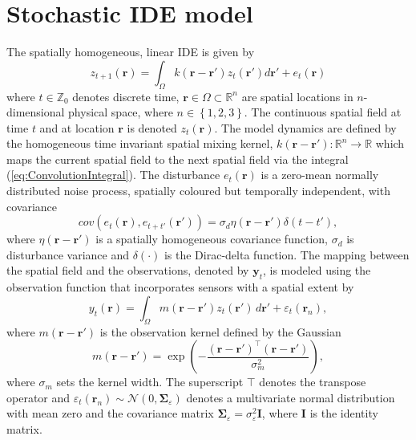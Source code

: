 \documentclass[draftcls,onecolumn]{IEEEtran}
\begin{document}
\section{Stochastic IDE model}
The spatially homogeneous, linear IDE is given by
\begin{equation}
 z_{t+1}\left(\mathbf{r}\right)=\int_{\Omega}k\left(\mathbf{r}-\mathbf{r}'\right)z_{t}\left(\mathbf{r}'\right)d\mathbf{r}'+e_{t}\left(\mathbf{r}\right)
\label{eq:ConvolutionIntegral}
\end{equation}
where $t\in \mathbb{Z}_0 $ denotes discrete time, $\mathbf{r} \in \Omega \subset \mathbb{R}^{n}$ are spatial locations in $n$-dimensional physical space, where $n \in \left\lbrace 1,2,3 \right\rbrace $. The continuous spatial field at time $t$ and at location $\mathbf r$ is denoted $z_t\left(\mathbf r\right)$. The model dynamics  are defined by the homogeneous time invariant spatial mixing kernel, $k\left(\mathbf{r}-\mathbf{r}'\right):\mathbb{R}^{n}\rightarrow \mathbb{R}$ which maps the current spatial field to the next spatial field via the integral (\ref{eq:ConvolutionIntegral}). The disturbance $e_{t}(\mathbf{r})$ is a zero-mean normally distributed noise process, spatially coloured but temporally independent, with covariance 
\begin{equation}
cov\left(e_{t}\left(\mathbf{r}\right),e_{t+t'}\left(\mathbf{r'}\right)\right)=\sigma_d\eta(\mathbf{r}-\mathbf{r'})\delta(t-t'),
\label{eq:FieldDisturbance}
\end{equation}
where $\eta(\mathbf{r}-\mathbf{r'})$ is a spatially homogeneous covariance function, $\sigma_d$ is disturbance variance and $\delta(\cdot)$ is the Dirac-delta function. The mapping between the spatial field and the observations, denoted by $\mathbf{y}_t$, is modeled using the observation function that incorporates sensors with a spatial extent by
\begin{equation}\label{eq:ObservationEquation}
	y_t(\mathbf{r}) = \int_{\Omega} { m\left(\mathbf{r}-\mathbf{r}'\right) z_t\left(\mathbf{r}'\right) \, d\mathbf{r}'} + \varepsilon_t(\mathbf{r}_n), 
\end{equation}
where $m\left(\mathbf{r}-\mathbf{r}'\right)$ is the observation kernel defined by the Gaussian
\begin{equation}
	m\left(\mathbf{r}-\mathbf{r}'\right) = \exp{\left(-\frac{(\mathbf{r}-\mathbf{r}')^\top(\mathbf{r}-\mathbf{r}')}{\sigma_m^2}\right)},
\end{equation}
where $\sigma_m$ sets the kernel width. The superscript $\top$ denotes the transpose operator and $\varepsilon_t(\mathbf{r}_n) \sim \mathcal{N}\left(0,\boldsymbol{\Sigma}_{\varepsilon}\right)$ denotes a multivariate normal distribution with mean zero and the covariance matrix $\boldsymbol{\Sigma}_{\varepsilon} = \sigma_{\varepsilon}^2\mathbf{I}$, where $\mathbf{I}$ is the identity matrix. 
\end{document}
